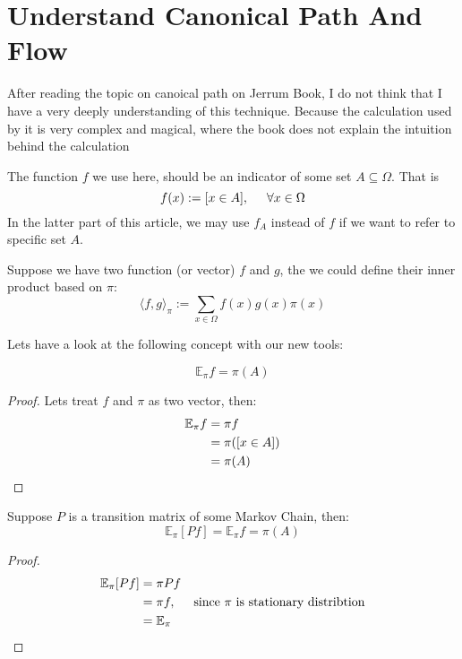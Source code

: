 \section{Understand Canonical Path And Flow}
After reading the topic on canoical path on Jerrum Book, I do not think that I have a very deeply understanding of this technique. Because the calculation used by it is very complex and magical, where the book does not explain the intuition behind the calculation

\begin{define}
  The function $f$ we use here, should be an indicator of some set $A\subseteq\Omega$. That is
  \[f(x) := [x\in A], \hspace{0.5cm} \forall x\in\Omega\]
  \tcblower
  In the latter part of this article, we may use $f_A$ instead of $f$ if we want to refer to specific set $A$.
\end{define}
\begin{define}
  Suppose we have two function (or vector) $f$ and $g$, the we could define their inner product based on $\pi$:
  \[\langle f, g \rangle_\pi := \sum_{x\in\Omega} f(x)g(x)\pi(x)\]
\end{define}
Lets have a look at the following concept with our new tools:
\begin{fact}
  \[\mathbb{E}_\pi f = \pi(A)\]
\end{fact}
\begin{proof}
  Lets treat $f$ and $\pi$ as two vector, then:
  \begin{align*}
    \mathbb{E}_\pi f &= \pi f \\
    &= \pi([x \in A]) \\
    &= \pi(A) \qedhere
  \end{align*}
\end{proof}
\begin{corollary}
  Suppose $P$ is a transition matrix of some Markov Chain, then:
  \[\mathbb{E}_\pi [Pf] = \mathbb{E}_\pi f = \pi(A)\]
\end{corollary}
\begin{proof}
  \begin{align*}
    \mathbb{E}_\pi [Pf] &= \pi Pf \\
    &= \pi f, \hspace{0.5cm} \mbox{since $\pi$ is stationary distribtion} \\
    &= \mathbb{E}_\pi \qedhere
  \end{align*}
\end{proof}
